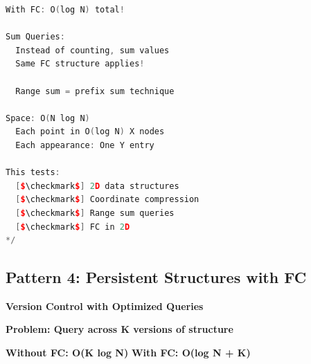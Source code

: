 \documentclass[11pt,a4paper,oneside]{book}
\begin{document}
\begin{lstlisting}[language=C++, caption=Tree Path FC Solutions - Problems 5-7]
  With FC: O(log N) total!

Sum Queries:
  Instead of counting, sum values
  Same FC structure applies!
  
  Range sum = prefix sum technique

Space: O(N log N)
  Each point in O(log N) X nodes
  Each appearance: One Y entry

This tests:
  [$\checkmark$] 2D data structures
  [$\checkmark$] Coordinate compression
  [$\checkmark$] Range sum queries
  [$\checkmark$] FC in 2D
*/
\end{lstlisting}

\subsection{Pattern 4: Persistent Structures with FC}

\begin{tcolorbox}[
    enhanced,breakable,
    colback=dangered!10,
    colframe=dangered,
    boxrule=2pt,
    arc=4mm,
    title=\textbf{Persistent + FC = Ultimate Power}
]
\textbf{Version Control with Optimized Queries}

\textbf{Problem: Query across K versions of structure}

\textbf{Without FC: O(K log N)}
\textbf{With FC: O(log N + K)}
\end{tcolorbox}
\end{document}
